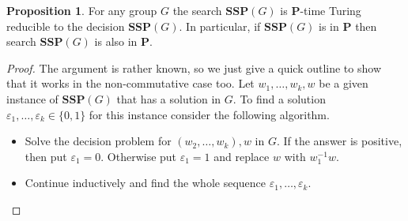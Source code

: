 \documentclass[10pt]{amsart}
\theoremstyle{definition}
\newtheorem{proposition}[theorem]{Proposition}
\def\P{{\mathbf{P}}}
\def\SSP{{\mathbf{SSP}}}
\begin{document}
\begin{proposition}
\label{pr:solutions-SSP}
For any group $G$ the search $\SSP(G)$ is $\P$-time Turing reducible to the decision $\SSP(G)$. In particular, if $\SSP(G)$ is in $\P$ then search $\SSP(G)$ is also in $\P$.
\end{proposition}
\begin{proof}
The argument is rather known, so we just give a quick outline to show that it works in the non-commutative case too. Let $w_1,\ldots,w_k,w$ be a given instance of $\SSP(G)$ that has a solution in $G$. To find a solution
$\varepsilon_1,\ldots,\varepsilon_k \in \{0,1\}$
for this instance consider the following algorithm.
\begin{itemize}
    \item
Solve the decision problem for $(w_2,\ldots,w_k),w$ in $G$. If the answer is positive, then
put $\varepsilon_1=0$. Otherwise put $\varepsilon_1=1$ and replace $w$ with $w_1^{-1}w$.
    \item
Continue inductively and find the whole sequence
$\varepsilon_1,\ldots,\varepsilon_k$.
\end{itemize}
\end{proof}
\end{document}
